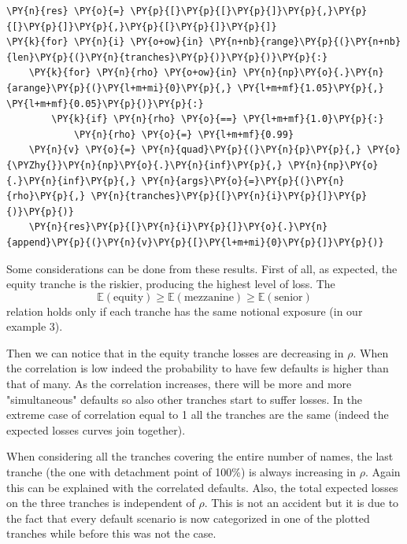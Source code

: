 \begin{tcolorbox}[breakable, size=fbox, boxrule=1pt, pad at break*=1mm,colback=cellbackground, colframe=cellborder]
\begin{Verbatim}[commandchars=\\\{\}]
\PY{n}{res} \PY{o}{=} \PY{p}{[}\PY{p}{[}\PY{p}{]}\PY{p}{,}\PY{p}{[}\PY{p}{]}\PY{p}{,}\PY{p}{[}\PY{p}{]}\PY{p}{]}
\PY{k}{for} \PY{n}{i} \PY{o+ow}{in} \PY{n+nb}{range}\PY{p}{(}\PY{n+nb}{len}\PY{p}{(}\PY{n}{tranches}\PY{p}{)}\PY{p}{)}\PY{p}{:}
    \PY{k}{for} \PY{n}{rho} \PY{o+ow}{in} \PY{n}{np}\PY{o}{.}\PY{n}{arange}\PY{p}{(}\PY{l+m+mi}{0}\PY{p}{,} \PY{l+m+mf}{1.05}\PY{p}{,} \PY{l+m+mf}{0.05}\PY{p}{)}\PY{p}{:}
        \PY{k}{if} \PY{n}{rho} \PY{o}{==} \PY{l+m+mf}{1.0}\PY{p}{:}
            \PY{n}{rho} \PY{o}{=} \PY{l+m+mf}{0.99}
    \PY{n}{v} \PY{o}{=} \PY{n}{quad}\PY{p}{(}\PY{n}{p}\PY{p}{,} \PY{o}{\PYZhy{}}\PY{n}{np}\PY{o}{.}\PY{n}{inf}\PY{p}{,} \PY{n}{np}\PY{o}{.}\PY{n}{inf}\PY{p}{,} \PY{n}{args}\PY{o}{=}\PY{p}{(}\PY{n}{rho}\PY{p}{,} \PY{n}{tranches}\PY{p}{[}\PY{n}{i}\PY{p}{]}\PY{p}{)}\PY{p}{)}
    \PY{n}{res}\PY{p}{[}\PY{n}{i}\PY{p}{]}\PY{o}{.}\PY{n}{append}\PY{p}{(}\PY{n}{v}\PY{p}{[}\PY{l+m+mi}{0}\PY{p}{]}\PY{p}{)}
\end{Verbatim}
\end{tcolorbox}

Some considerations can be done from these results. First of all, as expected, the equity tranche is the riskier, producing the highest level of loss. The 
\[
\mathbb{E}(\mathrm{equity})\ge \mathbb{E}(\mathrm{mezzanine}) \ge \mathbb{E}(\mathrm{senior})
\] 
relation holds only if each tranche has the same notional exposure (in our example 3).

Then we can notice that in the equity tranche losses are decreasing in $\rho$. When the correlation is low indeed the probability to have few defaults is higher than that of many. As the correlation increases, there will be more and more "simultaneous" defaults so also other tranches start to suffer losses. In the extreme case of correlation equal to 1 all the tranches are the same (indeed the expected losses curves join together). 

When considering all the tranches covering the entire number of names, the last tranche (the one with detachment point of 100\%) is always increasing in $\rho$. Again this can be explained with the correlated defaults. 
Also, the total expected losses on the three tranches is independent of $\rho$. This is not an accident but it is due to the fact that every default scenario is now categorized in one of the plotted tranches while before this was not the case.

